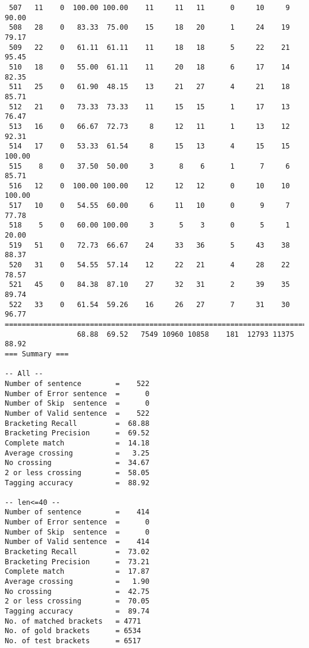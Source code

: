 \begin{verbatim}
 507   11    0  100.00 100.00    11     11   11      0     10     9    90.00
 508   28    0   83.33  75.00    15     18   20      1     24    19    79.17
 509   22    0   61.11  61.11    11     18   18      5     22    21    95.45
 510   18    0   55.00  61.11    11     20   18      6     17    14    82.35
 511   25    0   61.90  48.15    13     21   27      4     21    18    85.71
 512   21    0   73.33  73.33    11     15   15      1     17    13    76.47
 513   16    0   66.67  72.73     8     12   11      1     13    12    92.31
 514   17    0   53.33  61.54     8     15   13      4     15    15   100.00
 515    8    0   37.50  50.00     3      8    6      1      7     6    85.71
 516   12    0  100.00 100.00    12     12   12      0     10    10   100.00
 517   10    0   54.55  60.00     6     11   10      0      9     7    77.78
 518    5    0   60.00 100.00     3      5    3      0      5     1    20.00
 519   51    0   72.73  66.67    24     33   36      5     43    38    88.37
 520   31    0   54.55  57.14    12     22   21      4     28    22    78.57
 521   45    0   84.38  87.10    27     32   31      2     39    35    89.74
 522   33    0   61.54  59.26    16     26   27      7     31    30    96.77
============================================================================
                 68.88  69.52   7549 10960 10858    181  12793 11375    88.92
=== Summary ===

-- All --
Number of sentence        =    522
Number of Error sentence  =      0
Number of Skip  sentence  =      0
Number of Valid sentence  =    522
Bracketing Recall         =  68.88
Bracketing Precision      =  69.52
Complete match            =  14.18
Average crossing          =   3.25
No crossing               =  34.67
2 or less crossing        =  58.05
Tagging accuracy          =  88.92

-- len<=40 --
Number of sentence        =    414
Number of Error sentence  =      0
Number of Skip  sentence  =      0
Number of Valid sentence  =    414
Bracketing Recall         =  73.02
Bracketing Precision      =  73.21
Complete match            =  17.87
Average crossing          =   1.90
No crossing               =  42.75
2 or less crossing        =  70.05
Tagging accuracy          =  89.74
No. of matched brackets   = 4771
No. of gold brackets      = 6534
No. of test brackets      = 6517

\end{verbatim}

\normalsize

